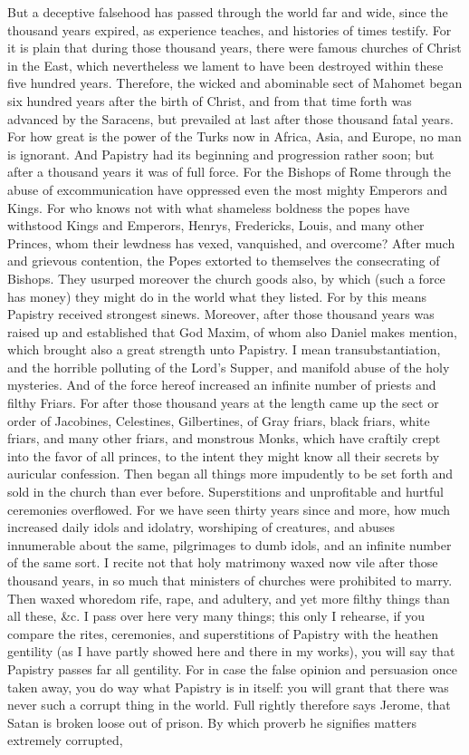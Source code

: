 But a deceptive falsehood has passed through the world far and wide, since the thousand years expired, as experience teaches, and histories of times testify. For it is plain that during those thousand years, there were famous churches of Christ in the East, which nevertheless we lament to have been destroyed within these five hundred years. Therefore, the wicked and abominable sect of Mahomet began six hundred years after the birth of Christ, and from that time forth was advanced by the Saracens, but prevailed at last after those thousand fatal years. For how great is the power of the Turks now in Africa, Asia, and Europe, no man is ignorant. And Papistry had its beginning and progression rather soon; but after a thousand years it was of full force. For the Bishops of Rome through the abuse of excommunication have oppressed even the most mighty Emperors and Kings. For who knows not with what shameless boldness the popes have withstood Kings and Emperors, Henrys, Fredericks, Louis, and many other Princes, whom their lewdness has vexed, vanquished, and overcome? After much and grievous contention, the Popes extorted to themselves the consecrating of Bishops. They usurped moreover the church goods also, by which (such a force has money) they might do in the world what they listed. For by this means Papistry received strongest sinews. Moreover, after those thousand years was raised up and established that God Maxim, of whom also Daniel makes mention, which brought also a great strength unto Papistry. I mean transubstantiation, and the horrible polluting of the Lord’s Supper, and manifold abuse of the holy mysteries. And of the force hereof increased an infinite number of priests and filthy Friars. For after those thousand years at the length came up the sect or order of Jacobines, Celestines, Gilbertines, of Gray friars, black friars, white friars, and many other friars, and monstrous Monks, which have craftily crept into the favor of all princes, to the intent they might know all their secrets by auricular confession. Then began all things more impudently to be set forth and sold in the church than ever before. Superstitions and unprofitable and hurtful ceremonies overflowed. For we have seen thirty years since and more, how much increased daily idols and idolatry, worshiping of creatures, and abuses innumerable about the same, pilgrimages to dumb idols, and an infinite number of the same sort. I recite not that holy matrimony waxed now vile after those thousand years, in so much that ministers of churches were prohibited to marry. Then waxed whoredom rife, rape, and adultery, and yet more filthy things than all these, \&c. I pass over here very many things; this only I rehearse, if you compare the rites, ceremonies, and superstitions of Papistry with the heathen gentility (as I have partly showed here and there in my works), you will say that Papistry passes far all gentility. For in case the false opinion and persuasion once taken away, you do way what Papistry is in itself: you will grant that there was never such a corrupt thing in the world. Full rightly therefore says Jerome, that Satan is broken loose out of prison. By which proverb he signifies matters extremely corrupted, 